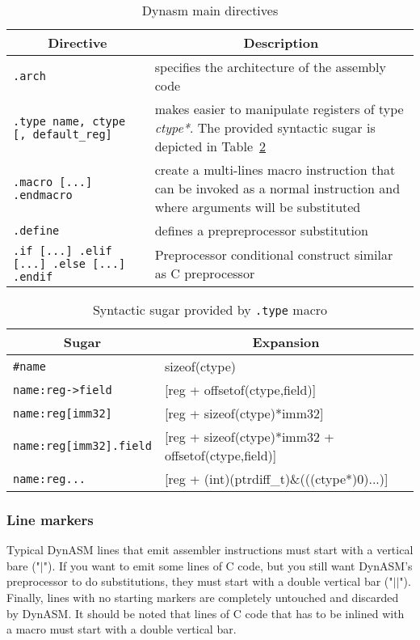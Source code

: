 \begin{table}[H]
\centering
\begin{tabular}{|p{5cm}|p{8cm}|}
    \hline
    \multicolumn{1}{|c|}{\textbf{Directive}} & \multicolumn{1}{c|}{\textbf{Description}} \\
    \hline
    \texttt{.arch} & specifies the architecture of the assembly code\\
    \hline
    \texttt{.type name, ctype [, default\_reg]} & makes easier to manipulate registers of type \emph{ctype*}. The provided syntactic sugar is depicted in Table~\ref{tab:type-sugar}\\
    \hline
    \texttt{.macro [...] .endmacro} & create a multi-lines macro instruction that can be invoked as a normal instruction and where arguments will be substituted\\
    \hline
    \texttt{.define} & defines a prepreprocessor substitution\\
    \hline
    \texttt{.if [...] .elif [...] .else [...] .endif} & Preprocessor conditional construct similar as C preprocessor\\
    \hline
\end{tabular}
\caption{Dynasm main directives}
\label{tab:dynasm-main-directives}
\end{table}

\begin{table}
\centering
\begin{tabular}{|l|l|}
\hline
\multicolumn{1}{|c|}{\textbf{Sugar}} & \multicolumn{1}{c|}{\textbf{Expansion}} \\\hline
\texttt{\#name  }                    & sizeof(ctype)\\
\texttt{name:reg-\textgreater field} & [reg + offsetof(ctype,field)]\\
\texttt{name:reg[imm32]}             & [reg + sizeof(ctype)*imm32]\\
\texttt{name:reg[imm32].field}       & [reg + sizeof(ctype)*imm32 + offsetof(ctype,field)]\\
\texttt{name:reg... }                & [reg + (int)(ptrdiff\_t)\&(((ctype*)0)...)]\\\hline
\end{tabular}
\caption{Syntactic sugar provided by \texttt{.type} macro}
\label{tab:type-sugar}
\end{table}

\subsubsection{Line markers}
Typical DynASM lines that emit assembler instructions must start with a
vertical bare ("\texttt{$\vert$}"). If you want to emit some lines of C code, but you still want DynASM's preprocessor to do substitutions, they must start with a double vertical bar ("\texttt{$\vert\vert$}"). Finally, lines with no starting markers are
completely untouched and discarded by DynASM. It should be noted that lines of C code that
has to be inlined with a macro must start with a double vertical bar.

